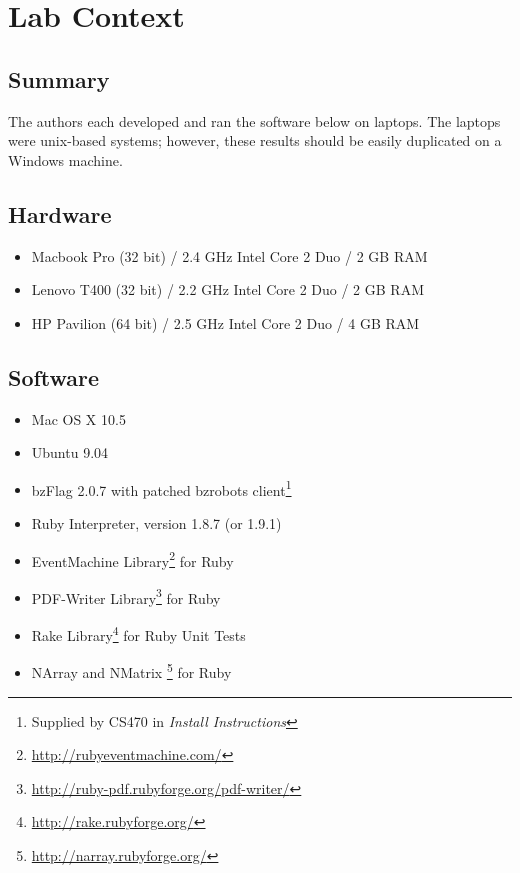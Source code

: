 \chapter{Lab Context}\label{chap:context}
\section{Summary}
The authors each developed and ran the software below on laptops.  The laptops were unix-based systems; however, these results should be easily duplicated on a Windows machine.

\section{Hardware}
\begin{itemize}
    \item Macbook Pro (32 bit) / 2.4 GHz Intel Core 2 Duo / 2 GB RAM
    \item Lenovo T400 (32 bit) / 2.2 GHz Intel Core 2 Duo / 2 GB RAM
    \item HP Pavilion (64 bit) / 2.5 GHz Intel Core 2 Duo / 4 GB RAM
\end{itemize}

\section{Software}
\begin{itemize}
    \item Mac OS X 10.5
    \item Ubuntu 9.04
    \item bzFlag 2.0.7 with patched bzrobots client\footnote{Supplied by CS470 in \textsl{Install Instructions}}
    \item Ruby Interpreter, version 1.8.7 (or 1.9.1)
    \item EventMachine Library\footnote{\url{http://rubyeventmachine.com/}} for Ruby
    \item PDF-Writer Library\footnote{\url{http://ruby-pdf.rubyforge.org/pdf-writer/}} for Ruby
    \item Rake Library\footnote{\url{http://rake.rubyforge.org/}} for Ruby Unit Tests
    \item NArray and NMatrix \footnote{\url{http://narray.rubyforge.org/}} for Ruby
\end{itemize}
